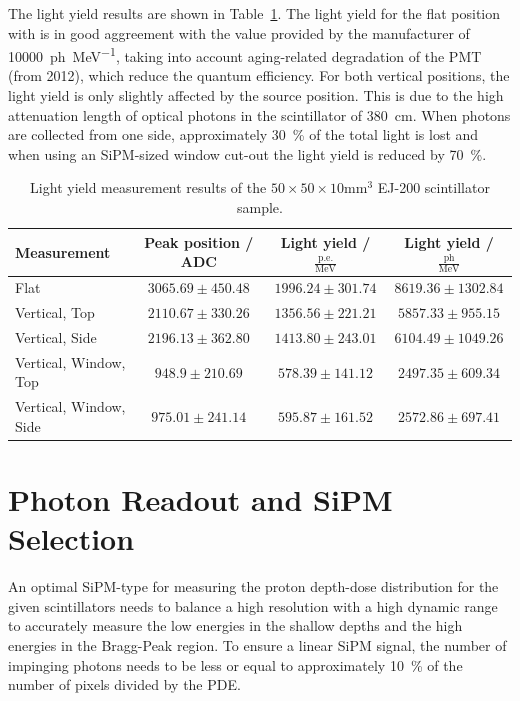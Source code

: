 The light yield results are shown in Table~\ref{tab:lightyield:ej200}.
The light yield for the flat position with is in good aggreement with the value provided by the manufacturer of \SI{10000}{ph\per\mega\electronvolt}, taking into account aging-related degradation of the PMT (from 2012), which reduce the quantum efficiency.
For both vertical positions, the light yield is only slightly affected by the source position.
This is due to the high attenuation length of optical photons in the scintillator of \SI{380}{\centi\meter}.
When photons are collected from one side, approximately \SI{30}{\percent} of the total light is lost and when using an \gls{SiPM}-sized window cut-out the light yield is reduced by \SI{70}{\percent}.

\begin{table}[h]
    \centering
    \begin{tabular}{l|c|c|c}
        Measurement & Peak position / ADC & Light yield / $\frac{\text{p.e.}}{\si{\mega\electronvolt}}$ & Light yield / $\frac{\text{ph}}{\si{\mega\electronvolt}}$ \\
        \hline 
        Flat & $3065.69 \pm 450.48$  & $1996.24 \pm 301.74$  & $8619.36 \pm 1302.84$ \\
        Vertical, Top & $2110.67 \pm 330.26$  & $1356.56 \pm 221.21$  & $5857.33 \pm 955.15$ \\
        Vertical, Side & $2196.13 \pm 362.80$  & $1413.80 \pm 243.01$  & $6104.49 \pm 1049.26$ \\
        Vertical, Window, Top & $948.9 \pm 210.69$  & $578.39 \pm 141.12$  & $2497.35 \pm 609.34$ \\
        Vertical, Window, Side & $975.01 \pm 241.14$  & $595.87 \pm 161.52$  & $2572.86 \pm 697.41$ \\
    \end{tabular}
    \caption{Light yield measurement results of the $50 \times 50 \times 10 \si{\milli\meter\cubed}$ EJ-200 scintillator sample.}\label{tab:lightyield:ej200}
\end{table}

\section{Photon Readout and SiPM Selection}\label{section:sipm:selection}
An optimal \gls{SiPM}-type for measuring the proton depth-dose distribution for the given scintillators needs to balance a high resolution with a high dynamic range to accurately measure the low energies in the shallow depths and the high energies in the Bragg-Peak region.
To ensure a linear \gls{SiPM} signal, the number of impinging photons needs to be less or equal to approximately \SI{10}{\percent} of the number of pixels divided by the \gls{PDE}. 


